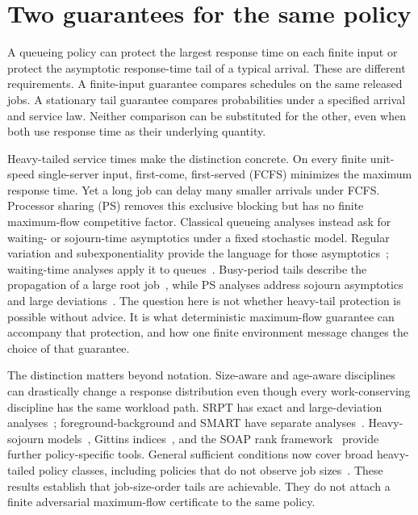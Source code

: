 \section{Two guarantees for the same policy}\label{sec:intro}
A queueing policy can protect the largest response time on each finite input or protect the asymptotic response-time tail of a typical arrival. These are different requirements. A finite-input guarantee compares schedules on the same released jobs. A stationary tail guarantee compares probabilities under a specified arrival and service law. Neither comparison can be substituted for the other, even when both use response time as their underlying quantity.

Heavy-tailed service times make the distinction concrete. On every finite unit-speed single-server input, first-come, first-served (FCFS) minimizes the maximum response time. Yet a long job can delay many smaller arrivals under FCFS. Processor sharing (PS) removes this exclusive blocking but has no finite maximum-flow competitive factor. Classical queueing analyses instead ask for waiting- or sojourn-time asymptotics under a fixed stochastic model. Regular variation and subexponentiality provide the language for those asymptotics~\cite{cohen1973,bingham1987,foss2013}; waiting-time analyses apply it to queues~\cite{abate1994,abate1997}. Busy-period tails describe the propagation of a large root job~\cite{zwart2001}, while PS analyses address sojourn asymptotics~\cite{zwartboxma2000,guillemin2004,borst2006} and large deviations~\cite{mandjes2006}. The question here is not whether heavy-tail protection is possible without advice. It is what deterministic maximum-flow guarantee can accompany that protection, and how one finite environment message changes the choice of that guarantee.

The distinction matters beyond notation. Size-aware and age-aware disciplines can drastically change a response distribution even though every work-conserving discipline has the same workload path. SRPT has exact and large-deviation analyses~\cite{schrage1966,nuyenszwart2006}; foreground-background and SMART have separate analyses~\cite{nuyenswierman2008,nuyenssmart2008}. Heavy-sojourn models~\cite{nunez2002}, Gittins indices~\cite{aalto2009,gittins2011}, and the SOAP rank framework~\cite{scully2018soap} provide further policy-specific tools. General sufficient conditions now cover broad heavy-tailed policy classes, including policies that do not observe job sizes~\cite{scully2020characterizing,scullyvankreveld2024}. These results establish that job-size-order tails are achievable. They do not attach a finite adversarial maximum-flow certificate to the same policy.

